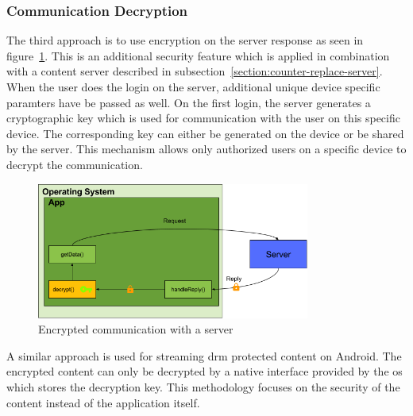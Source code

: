 \subsubsection{Communication Decryption} \label{section:counter-replace-encryption-content-communication}
The third approach is to use encryption on the server response as seen in figure~\ref{fig:encryptionComm}.
This is an additional security feature which is applied in combination with a content server described in subsection~\ref{section:counter-replace-server}.
When the user does the login on the server, additional unique device specific paramters have be passed as well.
On the first login, the server generates a cryptographic key which is used for communication with the user on this specific device.
The corresponding key can either be generated on the device or be shared by the server.
This mechanism allows only authorized users on a specific device to decrypt the communication.
\newline
\begin{figure}[h]
    \centering
    \includegraphics[width=0.8\textwidth]{data/encryptionComm.png}
    \caption{Encrypted communication with a server}
    \label{fig:encryptionComm}
\end{figure}

A similar approach is used for streaming \gls{drm} protected content on Android.
The encrypted content can only be decrypted by a native interface provided by the \gls{os} which stores the decryption key. \cite{androidDrm}
\newline
This methodology focuses on the security of the content instead of the application itself.
